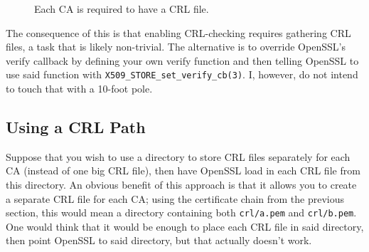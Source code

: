 \documentclass{article}
\begin{document}
\begin{center}
\begin{figure}
\begin{makeimage}
\end{makeimage}
\caption{Each CA is required to have a CRL file.}
\end{figure}
\end{center}

The consequence of this is that enabling CRL-checking requires gathering CRL files, a task that is likely non-trivial.  The alternative is to override OpenSSL's verify callback by defining your own verify function and then telling OpenSSL to use said function with \texttt{X509_STORE_set_verify_cb(3)}.  I, however, do not intend to touch that with a 10-foot pole.

\subsection{Using a CRL Path}
Suppose that you wish to use a directory to store CRL files separately for each CA (instead of one big CRL file), then have OpenSSL load in each CRL file from this directory.  An obvious benefit of this approach is that it allows you to create a separate CRL file for each CA; using the certificate chain from the previous section, this would mean a directory containing both \texttt{crl/a.pem} and \texttt{crl/b.pem}.  One would think that it would be enough to place each CRL file in said directory, then point OpenSSL to said directory, but that actually doesn't work.
\end{document}
